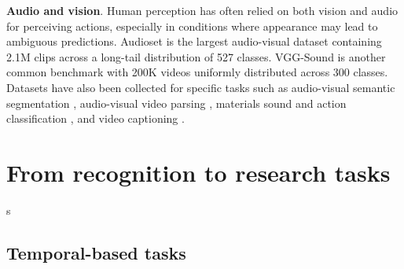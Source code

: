 \documentclass[smallextended,twocolumn,natbib]{svjour3}
\begin{document}
\noindent
\textbf{Audio and vision}. Human perception has often relied on both vision and audio for perceiving actions, especially in conditions where appearance may lead to ambiguous predictions. Audioset \citep{gemmeke2017audio} is the largest audio-visual dataset containing 2.1M clips across a long-tail distribution of 527 classes. VGG-Sound \citep{chen2020vggsound} is another common benchmark with 200K videos uniformly distributed across 300 classes. Datasets have also been collected for specific tasks such as audio-visual semantic segmentation \citep{zhou2022audio}, audio-visual video parsing \citep{tian2020unified}, materials sound and action classification \citep{huh2023epic,owens2016visually}, and video captioning \citep{monfort2021spoken}.




\section{From recognition to research tasks}
\label{sec:recognition}

\citep{wang2023learning}s

\subsection{Temporal-based tasks}

\citep{albanie2020end}
\citep{stergiou2023leaping}
\end{document}
